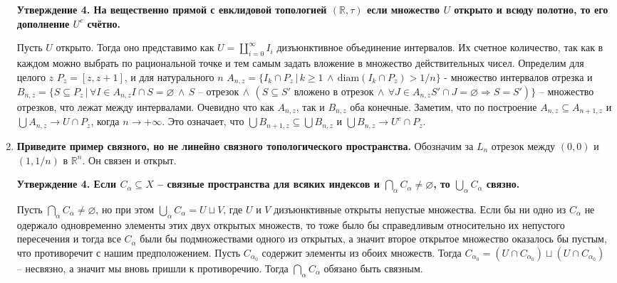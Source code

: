 \documentclass{article}
\begin{document}
\begin{enumerate}
        \textbf{Утверждение 4. На вещественно прямой с евклидовой топологией $(
        \mathbb{R},\tau)$ если множество $U$ открыто и всюду полотно, то его
        дополнение $U^c$ счётно.}

        Пусть $U$ открыто. Тогда оно представимо как $U=\coprod_{i=0}^{\infty}
        I_i$ дизъюнктивное объединение интервалов. Их счетное количество,
        так как в каждом можно выбрать по рациональной точке и тем самым задать
        вложение в множество действительных чисел. Определим для целого $z$
        $P_z=[z,z+1]$, и для натурального $n$ $A_{n,z}=\{I_k\cap P_z\,|\,k
        \geqslant 1\,\wedge\,\text{diam}(I_k\cap P_z)>1/n\}$ - множество
        интервалов отрезка и $B_{n,z}=\{S\subseteq P_z\,|\,\forall I\in A_{n,z}
        I\cap S=\varnothing\,\wedge\,S\text{ – отрезок}\,\wedge\,(S\subseteq S'
        \text{ вложено в отрезок}\,\wedge\,\forall J\in A_{n,z}S'\cap J=
        \varnothing\Rightarrow S=S')\}$ – множество отрезков, что лежат между
        интервалами. Очевидно что как $A_{n,z}$, так и $B_{n,z}$ оба конечные.
        Заметим, что по построение $A_{n,z}\subseteq A_{n+1,z}$ и $\bigcup
        A_{n,z}\rightarrow U\cap P_z$, когда $n\rightarrow +\infty$. Это
        означает, что $\bigcup B_{n+1,z}\subseteq \bigcup B_{n,z}$ и $\bigcup
        B_{n,z}\rightarrow U^c\cap P_z$.

    \item \textbf{Приведите пример связного, но не линейно связного
        топологического пространства.}
    Обозначим за $L_n$ отрезок между $(0,0)$ и $(1,1/n)$ в $\mathbb{R}^n$. Он
    связен и открыт.\par

    \textbf{Утверждение 4. Если $C_\alpha\subseteq X$ – связные пространства
    для всяких индексов и $\bigcap_\alpha C_\alpha\neq\varnothing$, то
    $\bigcup_\alpha C_\alpha$ связно.}\par

    Пусть $\bigcap_\alpha C_\alpha\neq\varnothing$, но при этом $\bigcup_\alpha
    C_\alpha=U\sqcup V$, где $U$ и $V$ дизъюнктивные открыты непустые множества.
    Если бы ни одно из $C_\alpha$ не одержало одновременно элементы этих двух
    открытых множеств, то тоже было бы справедливым относительно их непустого
    пересечения и тогда все $C_\alpha$ были бы подмножествами одного из
    открытых, а значит второе открытое множество оказалось бы пустым, что
    противоречит с нашим предположением. Пусть $C_{\alpha_0}$ содержит элементы
    из обоих множеств. Тогда $C_{\alpha_0}=(U\cap C_{\alpha_0})\sqcup (U\cap C_
    {\alpha_0})$ – несвязно, а значит мы вновь пришли к противоречию. Тогда
    $\bigcap_\alpha C_\alpha$ обязано быть связным.


\end{enumerate}
\end{document}
